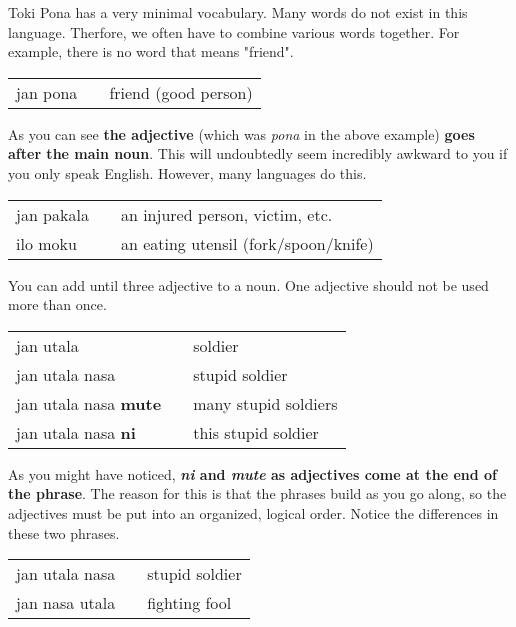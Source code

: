 Toki Pona has a very minimal vocabulary. 
Many words do not exist in this language. 
Therfore, we often have to combine various words together.
For example, there is no word that means "friend". 

\begin{supertabular}{p{5,5cm}|ll}
jan pona && friend (good person) \\
\end{supertabular} 

As you can see \textbf{the adjective} (which was \textit{pona} in the above example) \textbf{goes after the main noun}. 
This will undoubtedly seem incredibly awkward to you if you only speak English. 
However, many languages do this. 

\begin{supertabular}{p{5,5cm}|ll}
jan pakala && an injured person, victim, etc. \\
ilo moku && an eating utensil (fork/spoon/knife) \\
\end{supertabular} 

You can add until three adjective to a noun. 
One adjective should not be used more than once.

\begin{supertabular}{p{5,5cm}|ll}
jan utala && soldier  \\
jan utala nasa && stupid soldier  \\
jan utala nasa \textbf{mute} && many stupid soldiers  \\
jan utala nasa \textbf{ni} && this stupid soldier  \\
\end{supertabular} 

As you might have noticed, \textbf{\textit{ni} and \textit{mute} as adjectives come at the end of the phrase}. 
The reason for this is that the phrases build as you go along, so the adjectives must be put into an organized, logical order. 
Notice the differences in these two phrases.

\begin{supertabular}{p{5,5cm}|ll}
jan utala nasa && stupid soldier  \\
jan nasa utala && fighting fool \\
\end{supertabular}

